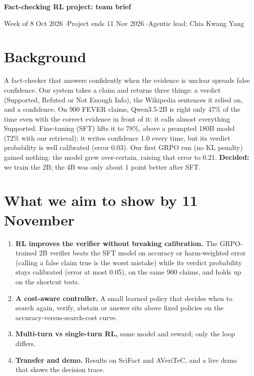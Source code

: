 \documentclass[10pt]{article}
\begin{document}
{\large\bfseries Fact-checking RL project: team brief\par}
\vspace{1pt}
{\small Week of 8 Oct 2026 \quad$\cdot$\quad Project ends 11 Nov 2026 \quad$\cdot$\quad Agentic lead: Chia Kwang Yang}

\section*{Background}
A fact-checker that answers confidently when the evidence is unclear spreads false confidence. Our system takes a claim and returns three things: a verdict
(Supported, Refuted or Not Enough Info), the Wikipedia sentences it relied on, and a confidence. On 900
FEVER claims, Qwen3.5-2B is right only 47\% of the time even with the correct evidence in front of it; it calls almost everything Supported.
Fine-tuning (SFT) lifts it to 78\%, above a prompted 180B model (72\% with our retrieval); it writes confidence 1.0 every time, but its verdict probability is well calibrated (error 0.03).
Our first GRPO run (no KL penalty) gained nothing: the model grew over-certain, raising that error to 0.21.
\textbf{Decided:} we train the 2B; the 4B was only about 1 point better after SFT.

\section*{What we aim to show by 11 November}
\begin{enumerate}
  \item \textbf{RL improves the verifier without breaking calibration.} The GRPO-trained 2B verifier beats the SFT model on
        accuracy or harm-weighted error (calling a false claim true is the worst mistake) while its verdict probability stays
        calibrated (error at most 0.05), on the same 900 claims, and holds up on the shortcut tests.
  \item \textbf{A cost-aware controller.} A small learned policy that decides when to search again, verify,
        abstain or answer sits above fixed policies on the accuracy-versus-search-cost curve.
  \item \textbf{Multi-turn vs single-turn RL,} same model and reward; only the loop differs.
  \item \textbf{Transfer and demo.} Results on SciFact and AVeriTeC, and a live demo that shows the decision trace.
\end{enumerate}
\end{document}
